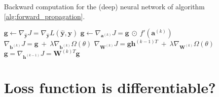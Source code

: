 		\begin{algorithm}
			\caption{Backward computation for the (deep) neural network of algorithm \ref{alg:forward_propagation}.
			}
			\label{alg:backward_propagation}
			\begin{algorithmic}[1]
					\State $\mathbf{g} \leftarrow \nabla_{\hat{\mathbf{y}}}J = \nabla_{\hat{\mathbf{y}}}
					L(\hat{\mathbf{y}}, \mathbf{y})$
						\State $\mathbf{g} \leftarrow \nabla_{\mathbf{a}^{(k)}}J = \mathbf{g} \ \odot \
						f'(\mathbf{a}^{(k)})$
						\State $\nabla_{\mathbf{b}^{(k)}}J = \mathbf{g} \ + \ \lambda \nabla_{\mathbf{b}^{(k)}}
						\Omega(\theta)$
						\State $\nabla_{\mathbf{W}^{(k)}}J = \mathbf{g}\mathbf{h}^{(k - 1)T} \ + \ \lambda
						\nabla_{\mathbf{W}^{(k)}} \Omega(\theta)$
						\State $\mathbf{g} = \nabla_{\mathbf{h}^{(k - 1)}}J = \mathbf{W}^{(k)T}\mathbf{g}$
					\EndFor
				\EndProcedure
			\end{algorithmic}
		\end{algorithm}

	\section{Loss function is differentiable?} %
	\label{sec:loss_function_is_differentiable_}


